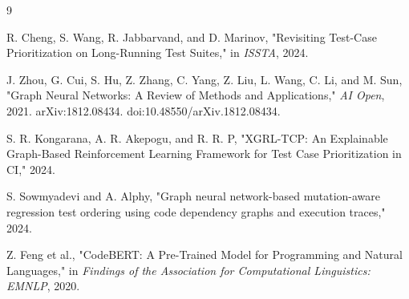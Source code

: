 \begin{thebibliography}{9}

R. Cheng, S. Wang, R. Jabbarvand, and D. Marinov, "Revisiting Test-Case Prioritization on Long-Running Test Suites," in \textit{ISSTA}, 2024.

J. Zhou, G. Cui, S. Hu, Z. Zhang, C. Yang, Z. Liu, L. Wang, C. Li, and M. Sun, "Graph Neural Networks: A Review of Methods and Applications," \textit{AI Open}, 2021. arXiv:1812.08434. doi:10.48550/arXiv.1812.08434.

S. R. Kongarana, A. R. Akepogu, and R. R. P, "XGRL-TCP: An Explainable Graph-Based Reinforcement Learning Framework for Test Case Prioritization in CI," 2024.

S. Sowmyadevi and A. Alphy, "Graph neural network-based mutation-aware regression test ordering using code dependency graphs and execution traces," 2024.

Z. Feng et al., "CodeBERT: A Pre-Trained Model for Programming and Natural Languages," in \textit{Findings of the Association for Computational Linguistics: EMNLP}, 2020.

\end{thebibliography}
